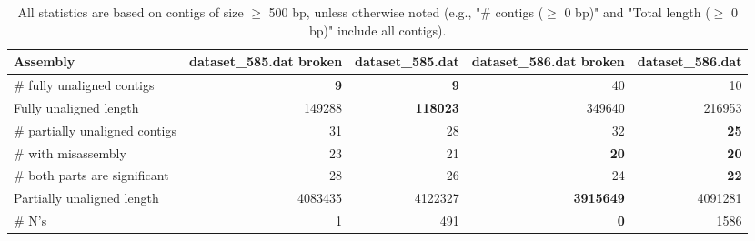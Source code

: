 \documentclass[12pt,a4paper]{article}
\begin{document}
\begin{table}[ht]
\begin{center}
\caption{All statistics are based on contigs of size $\geq$ 500 bp, unless otherwise noted (e.g., "\# contigs ($\geq$ 0 bp)" and "Total length ($\geq$ 0 bp)" include all contigs).}
\begin{tabular}{|l*{4}{|r}|}
\hline
Assembly & dataset\_585.dat broken & dataset\_585.dat & dataset\_586.dat broken & dataset\_586.dat \\ \hline
\# fully unaligned contigs & {\bf 9} & {\bf 9} & 40 & 10 \\ \hline
Fully unaligned length & 149288 & {\bf 118023} & 349640 & 216953 \\ \hline
\# partially unaligned contigs & 31 & 28 & 32 & {\bf 25} \\ \hline
\hspace{5mm}\# with misassembly & 23 & 21 & {\bf 20} & {\bf 20} \\ \hline
\hspace{5mm}\# both parts are significant & 28 & 26 & 24 & {\bf 22} \\ \hline
Partially unaligned length & 4083435 & 4122327 & {\bf 3915649} & 4091281 \\ \hline
\# N's & 1 & 491 & {\bf 0} & 1586 \\ \hline
\end{tabular}
\end{center}
\end{table}
\end{document}
